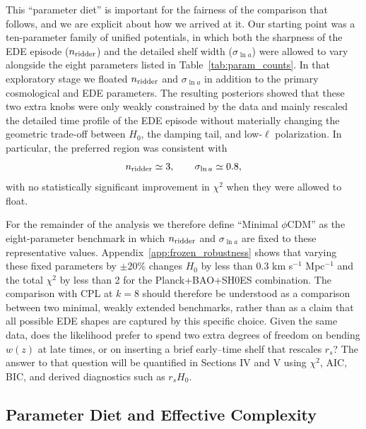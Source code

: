 \documentclass[a4paper,11pt]{article}
\begin{document}
This ``parameter diet'' is important for the fairness of the comparison that follows, and we are explicit about how we arrived at it. Our starting point was a ten-parameter family of unified potentials, in which both the sharpness of the EDE episode ($n_{\rm ridder}$) and the detailed shelf width ($\sigma_{\ln a}$) were allowed to vary alongside the eight parameters listed in Table~\ref{tab:param_counts}. In that exploratory stage we floated $n_{\rm ridder}$ and $\sigma_{\ln a}$ in addition to the primary cosmological and EDE parameters. The resulting posteriors showed that these two extra knobs were only weakly constrained by the data and mainly rescaled the detailed time profile of the EDE episode without materially changing the geometric trade-off between $H_0$, the damping tail, and low-$\ell$ polarization. In particular, the preferred region was consistent with
\begin{equation}
n_{\rm ridder} \simeq 3, \qquad \sigma_{\ln a} \simeq 0.8,
\end{equation}
with no statistically significant improvement in $\chi^2$ when they were allowed to float.

For the remainder of the analysis we therefore define ``Minimal $\phi$CDM'' as the eight-parameter benchmark in which $n_{\rm ridder}$ and $\sigma_{\ln a}$ are fixed to these representative values. Appendix~\ref{app:frozen_robustness} shows that varying these fixed parameters by $\pm 20\%$ changes $H_0$ by less than 0.3 km s$^{-1}$ Mpc$^{-1}$ and the total $\chi^2$ by less than 2 for the Planck+BAO+SH0ES combination. The comparison with CPL at $k = 8$ should therefore be understood as a comparison between two minimal, weakly extended benchmarks, rather than as a claim that all possible EDE shapes are captured by this specific choice. Given the same data, does the likelihood prefer to spend two extra degrees of freedom on bending $w(z)$ at late times, or on inserting a brief early--time shelf that rescales $r_s$? The answer to that question will be quantified in Sections IV and V using $\chi^2$, AIC, BIC, and derived diagnostics such as $r_s H_0$.


\subsection{Parameter Diet and Effective Complexity}
\label{sec:param_diet}
\end{document}
